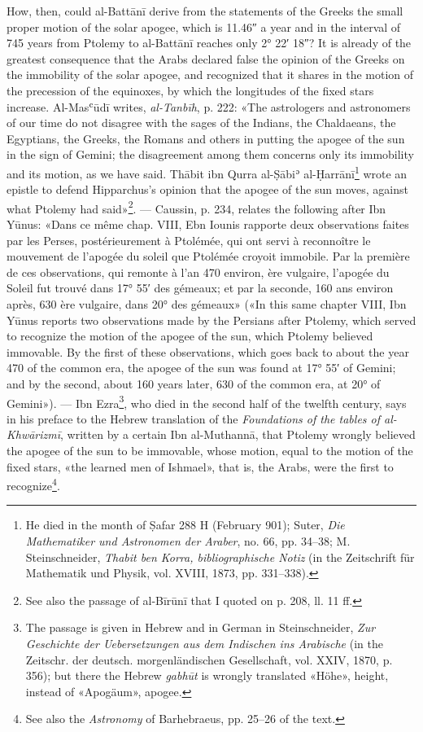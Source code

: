 \documentclass[11pt]{article}
\begin{document}
\par How, then, could al-Battānī derive from the statements of the Greeks the small proper motion of the solar apogee, which is 11.46″ a year and in the interval of 745 years from Ptolemy to al-Battānī reaches only 2° 22′ 18″? It is already of the greatest consequence that the Arabs declared false the opinion of the Greeks on the immobility of the solar apogee, and recognized that it shares in the motion of the precession of the equinoxes, by which the longitudes of the fixed stars increase. Al-Masʿūdī writes, \emph{al-Tanbīh}, p. 222: «The astrologers and astronomers of our time do not disagree with the sages of the Indians, the Chaldaeans, the Egyptians, the Greeks, the Romans and others in putting the apogee of the sun in the sign of Gemini; the disagreement among them concerns only its immobility and its motion, as we have said. Thābit ibn Qurra al-Ṣābiʾ al-Ḥarrānī\footnote{He died in the month of Ṣafar 288 H (February 901); Suter, \emph{Die Mathematiker und Astronomen der Araber}, no. 66, pp. 34–38; M. Steinschneider, \emph{Thabit ben Korra, bibliographische Notiz} (in the Zeitschrift für Mathematik und Physik, vol. XVIII, 1873, pp. 331–338).} wrote an epistle to defend Hipparchus's opinion that the apogee of the sun moves, against what Ptolemy had said»\footnote{See also the passage of al-Bīrūnī that I quoted on p. 208, ll. 11 ff.}. — Caussin, p. 234, relates the following after Ibn Yūnus: «Dans ce même chap. VIII, Ebn Iounis rapporte deux observations faites par les Perses, postérieurement à Ptolémée, qui ont servi à reconnoître le mouvement de l’apogée du soleil que Ptolémée croyoit immobile. Par la première de ces observations, qui remonte à l’an 470 environ, ère vulgaire, l’apogée du Soleil fut trouvé dans 17° 55′ des gémeaux; et par la seconde, 160 ans environ après, 630 ère vulgaire, dans 20° des gémeaux» («In this same chapter VIII, Ibn Yūnus reports two observations made by the Persians after Ptolemy, which served to recognize the motion of the apogee of the sun, which Ptolemy believed immovable. By the first of these observations, which goes back to about the year 470 of the common era, the apogee of the sun was found at 17° 55′ of Gemini; and by the second, about 160 years later, 630 of the common era, at 20° of Gemini»). — Ibn Ezra\footnote{The passage is given in Hebrew and in German in Steinschneider, \emph{Zur Geschichte der Uebersetzungen aus dem Indischen ins Arabische} (in the Zeitschr. der deutsch. morgenländischen Gesellschaft, vol. XXIV, 1870, p. 356); but there the Hebrew \emph{gabhūt} is wrongly translated «Höhe», height, instead of «Apogäum», apogee.}, who died in the second half of the twelfth century, says in his preface to the Hebrew translation of the \emph{Foundations of the tables of al-Khwārizmī}, written by a certain Ibn al-Muthannā, that Ptolemy wrongly believed the apogee of the sun to be immovable, whose motion, equal to the motion of the fixed stars, «the learned men of Ishmael», that is, the Arabs, were the first to recognize\footnote{See also the \emph{Astronomy} of Barhebraeus, pp. 25–26 of the text.}.\par
\end{document}

